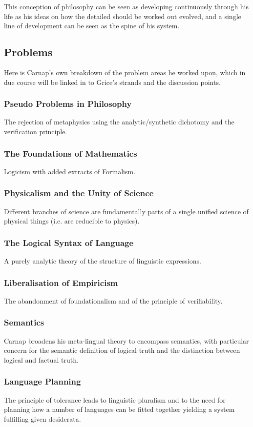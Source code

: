 \documentclass[10pt,titlepage]{book}
\begin{document}
This conception of philosophy can be seen as developing continuously through his life as his ideas on how the detailed should be worked out evolved, and a single line of development can be seen as the spine of his system.

\subsection{Problems}

Here is Carnap's own breakdown of the problem areas he worked upon, which in due course will be linked in to Grice's strands and the discussion points.

\subsubsection{Pseudo Problems in Philosophy}
The rejection of metaphysics using the analytic/synthetic dichotomy and the verification principle.
\subsubsection{The Foundations of Mathematics}
Logicism with added extracts of Formalism.
\subsubsection{Physicalism and the Unity of Science}
Different branches of science are fundamentally parts of a single unified science of physical things (i.e. are reducible to physics).
\subsubsection{The Logical Syntax of Language}
A purely analytic theory of the structure of linguistic expressions.
\subsubsection{Liberalisation of Empiricism}
The abandonment of foundationalism and of the principle of verifiability.
\subsubsection{Semantics}
Carnap broadens his meta-lingual theory to encompass semantics, with particular concern for the semantic definition of logical truth and the distinction between logical and factual truth.
\subsubsection{Language Planning}
The principle of tolerance leads to linguistic pluralism and to the need for planning how a number of languages can be fitted together yielding a system fulfilling given desiderata.
\end{document}
